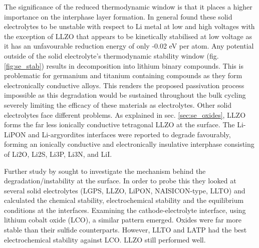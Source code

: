 \documentclass[../main.tex]{subfiles}
\begin{document}
The significance of the reduced thermodynamic window is that it places a higher importance on the interphase layer formation. In general \citeauthor{Zhu2015} found these solid electrolytes to be unstable with respect to Li metal at low and high voltages with the exception of LLZO that appears to be kinetically stabilised at low voltage as it has an unfavourable reduction energy of only -0.02 eV per atom. Any potential outside of the solid electrolyte's thermodynamic stability window (fig. \ref{fig:se_stab}) results in decomposition into lithium binary compounds. This is problematic for germanium and titanium containing compounds as they form electronically conductive alloys.\cite{Zhu2015} This renders the proposed passivation process impossible\cite{Mo2012, Zhu2015} as this degradation would be sustained throughout the bulk cycling severely limiting the efficacy of these materials as electrolytes. Other solid electrolytes face different problems. As explained in sec. \ref{sec:se_oxides}, LLZO forms the far less ionically conductive tetragonal LLZO at the surface. The Li-LiPON and Li-argyordites interfaces were reported to degrade favourably, forming an ionically conductive and electronically insulative interphase consisting of Li2O, Li2S, Li3P, Li3N, and LiI.\cite{Zhu2015} 


Further study by \citeauthor{Zhu2016} sought to investigate the mechanism behind the degradation/instability at the surface.\cite{Zhu2016} In order to probe this they looked at several solid electrolytes (LGPS, LLZO, LiPON, NAISICON-type, LLTO) and calculated the chemical stability, electrochemical stability and the equilibrium conditions at the interfaces. Examining the cathode-electrolyte interface, using lithium cobalt oxide (LCO), a similar pattern emerged. Oxides were far more stable than their sulfide counterparts. However, LLTO and LATP had the best electrochemical stability against LCO. LLZO still performed well. 
\end{document}
